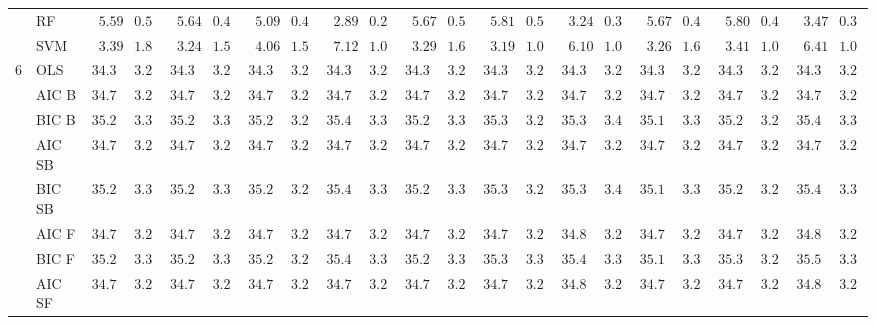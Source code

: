 \begin{tabular}{p{0.2cm}p{1cm}|p{0.6cm}p{0.6cm}|p{0.6cm}p{0.6cm}p{0.6cm}p{0.6cm}p{0.6cm}p{0.6cm}|p{0.6cm}p{0.6cm}p{0.6cm}p{0.6cm}p{0.6cm}p{0.6cm}|p{0.6cm}p{0.6cm}p{0.6cm}p{0.6cm}p{0.6cm}p{0.6cm}}
 & RF  & $\phantom{0}5.59$ & $0.51$ & $\phantom{0}5.64$ & $0.45$ & $\phantom{0}5.09$ & $0.42$ & $\phantom{0}2.89$ & $0.28$ & $\phantom{0}5.67$ & $0.54$ & $\phantom{0}5.81$ & $0.51$ & $\phantom{0}3.24$ & $0.35$ & $\phantom{0}5.67$ & $0.43$ & $\phantom{0}5.80$ & $0.49$ & $\phantom{0}3.47$ & $0.39$ \\
 & SVM  & $\phantom{0}3.39$ & $1.84$ & $\phantom{0}3.24$ & $1.54$ & $\phantom{0}4.06$ & $1.55$ & $\phantom{0}7.12$ & $1.01$ & $\phantom{0}3.29$ & $1.61$ & $\phantom{0}3.19$ & $1.02$ & $\phantom{0}6.10$ & $1.04$ & $\phantom{0}3.26$ & $1.64$ & $\phantom{0}3.41$ & $1.03$ & $\phantom{0}6.41$ & $1.07$ \\\hline
6 & OLS  & $34.30$ & $3.22$ & $34.30$ & $3.22$ & $34.30$ & $3.22$ & $34.30$ & $3.22$ & $34.30$ & $3.22$ & $34.30$ & $3.22$ & $34.30$ & $3.22$ & $34.30$ & $3.22$ & $34.30$ & $3.22$ & $34.30$ & $3.22$ \\
 & AIC B  & $34.70$ & $3.21$ & $34.76$ & $3.28$ & $34.74$ & $3.28$ & $34.73$ & $3.26$ & $34.73$ & $3.25$ & $34.71$ & $3.28$ & $34.71$ & $3.25$ & $34.74$ & $3.25$ & $34.70$ & $3.26$ & $34.71$ & $3.29$ \\
 & BIC B  & $35.27$ & $3.31$ & $35.26$ & $3.35$ & $35.29$ & $3.26$ & $35.40$ & $3.35$ & $35.25$ & $3.31$ & $35.30$ & $3.28$ & $35.36$ & $3.40$ & $35.14$ & $3.31$ & $35.27$ & $3.28$ & $35.42$ & $3.33$ \\
 & AIC SB  & $34.70$ & $3.21$ & $34.76$ & $3.28$ & $34.74$ & $3.28$ & $34.73$ & $3.26$ & $34.73$ & $3.25$ & $34.71$ & $3.28$ & $34.71$ & $3.25$ & $34.74$ & $3.25$ & $34.70$ & $3.26$ & $34.71$ & $3.29$ \\
 & BIC SB  & $35.27$ & $3.31$ & $35.26$ & $3.35$ & $35.29$ & $3.26$ & $35.40$ & $3.35$ & $35.25$ & $3.31$ & $35.30$ & $3.28$ & $35.36$ & $3.40$ & $35.14$ & $3.31$ & $35.27$ & $3.28$ & $35.42$ & $3.33$ \\
 & AIC F  & $34.71$ & $3.22$ & $34.76$ & $3.28$ & $34.75$ & $3.28$ & $34.77$ & $3.27$ & $34.74$ & $3.25$ & $34.76$ & $3.27$ & $34.83$ & $3.29$ & $34.75$ & $3.25$ & $34.75$ & $3.23$ & $34.82$ & $3.27$ \\
 & BIC F  & $35.27$ & $3.31$ & $35.26$ & $3.35$ & $35.29$ & $3.26$ & $35.49$ & $3.32$ & $35.25$ & $3.31$ & $35.34$ & $3.32$ & $35.44$ & $3.38$ & $35.17$ & $3.33$ & $35.30$ & $3.29$ & $35.50$ & $3.38$ \\
 & AIC SF  & $34.71$ & $3.22$ & $34.76$ & $3.28$ & $34.75$ & $3.28$ & $34.77$ & $3.27$ & $34.74$ & $3.25$ & $34.76$ & $3.27$ & $34.83$ & $3.29$ & $34.75$ & $3.25$ & $34.75$ & $3.23$ & $34.82$ & $3.27$ \\

\end{tabular}
